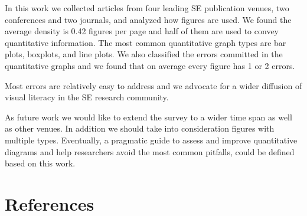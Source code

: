 \documentclass[
  10pt,
  conference,
]{IEEEtran}%
\begin{document}
In this work we collected articles from four leading SE publication
venues, two conferences and two journals, and analyzed how figures are
used. We found the average density is 0.42 figures per page and half of
them are used to convey quantitative information. The most common
quantitative graph types are bar plots, boxplots, and line plots. We
also classified the errors committed in the quantitative graphs and we
found that on average every figure has 1 or 2 errors.

Most errors are relatively easy to address and we advocate for a wider
diffusion of visual literacy in the SE research community.

As future work we would like to extend the survey to a wider time span
as well as other venues. In addition we should take into consideration
figures with multiple types. Eventually, a pragmatic guide to assess and
improve quantitative diagrams and help researchers avoid the most common
pitfalls, could be defined based on this work.

\section*{References}\label{references}
\end{document}
